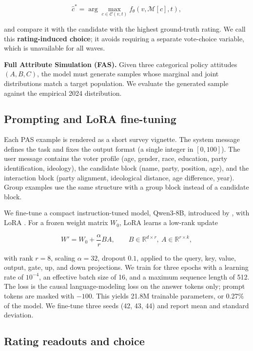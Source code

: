 \[
\hat c^{\ast} = \arg\max_{c\in\mathcal{C}(v,t)} f_\theta(v,\mathcal{M}[c],t),
\]

and compare it with the candidate with the highest ground-truth rating.
We call this \textbf{rating-induced choice}; it avoids requiring a
separate vote-choice variable, which is unavailable for all waves.

\textbf{Full Attribute Simulation (FAS).} Given three categorical policy
attitudes \((A,B,C)\), the model must generate samples whose marginal
and joint distributions match a target population. We evaluate the
generated sample against the empirical 2024 distribution.

\subsection{Prompting and LoRA
fine-tuning}\label{prompting-and-lora-fine-tuning}

Each PAS example is rendered as a short survey vignette. The system
message defines the task and fixes the output format (a single integer
in \([0,100]\)). The user message contains the voter profile (age,
gender, race, education, party identification, ideology), the candidate
block (name, party, position, age), and the interaction block (party
alignment, ideological distance, age difference, year). Group examples
use the same structure with a group block instead of a candidate block.

We fine-tune a compact instruction-tuned model, Qwen3-8B, introduced by
\citet{yang2025qwen3}, with LoRA \citep{hu2022lora}. For a frozen weight
matrix \(W_0\), LoRA learns a low-rank update

\[
W' = W_0 + \frac{\alpha}{r}BA,
\qquad B\in\mathbb{R}^{d\times r},\ A\in\mathbb{R}^{r\times k},
\]

with rank \(r=8\), scaling \(\alpha=32\), dropout \(0.1\), applied to
the query, key, value, output, gate, up, and down projections. We train
for three epochs with a learning rate of \(10^{-4}\), an effective batch
size of 16, and a maximum sequence length of 512. The loss is the causal
language-modeling loss on the answer tokens only; prompt tokens are
masked with \(-100\). This yields 21.8M trainable parameters, or 0.27\%
of the model. We fine-tune three seeds (42, 43, 44) and report mean and
standard deviation.

\subsection{Rating readouts and
choice}\label{rating-readouts-and-choice}


